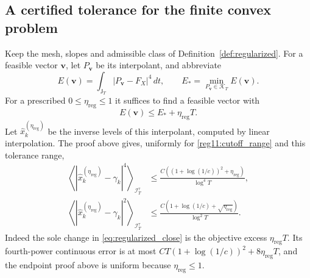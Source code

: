 \subsection{A certified tolerance for the finite convex problem}
\label{reg11:tolerance_section}
Keep the mesh, slopes and admissible class of Definition~\ref{def:regularized}.
For a feasible vector $\mathbf v$, let $P_{\mathbf v}$ be its interpolant,
and abbreviate
\[
E(\mathbf v)=\int_{\mathsf J_T}|P_{\mathbf v}-F_X|^4\,dt,
\qquad E_* =\min_{P_{\mathbf v}\in\mathcal K_T}E(\mathbf v).
\]
For a prescribed $0\le\eta_{\mathrm{reg}}\le1$ it suffices to find a feasible
vector with
\begin{equation}
E(\mathbf v)\le E_*+\eta_{\mathrm{reg}}T.
\label{reg11:objective_tolerance}
\end{equation}
Let $\widehat x_k^{(\eta_{\mathrm{reg}})}$ be the inverse levels of this
interpolant, computed by linear interpolation. The proof above gives,
uniformly for \eqref{reg11:cutoff_range} and this tolerance range,
\begin{equation}
\begin{split}
\left\langle|\widehat x_k^{(\eta_{\mathrm{reg}})}-\gamma_k|^4
\right\rangle_{\mathcal I_T^\tau}
&\le\frac{C((1+\log(1/c))^2+\eta_{\mathrm{reg}})}{\log^4T},\\
\left\langle|\widehat x_k^{(\eta_{\mathrm{reg}})}-\gamma_k|^2
\right\rangle_{\mathcal I_T^\tau}
&\le\frac{C(1+\log(1/c)+\sqrt{\eta_{\mathrm{reg}}})}{\log^2T}.
\end{split}
\label{reg11:inexact_moments}
\end{equation}
Indeed the sole change in \eqref{eq:regularized_close} is the objective
excess $\eta_{\mathrm{reg}}T$. Its fourth-power continuous error is at
most $C T(1+\log(1/c))^2+8\eta_{\mathrm{reg}}T$, and the endpoint proof
above is uniform because $\eta_{\mathrm{reg}}\le1$.

